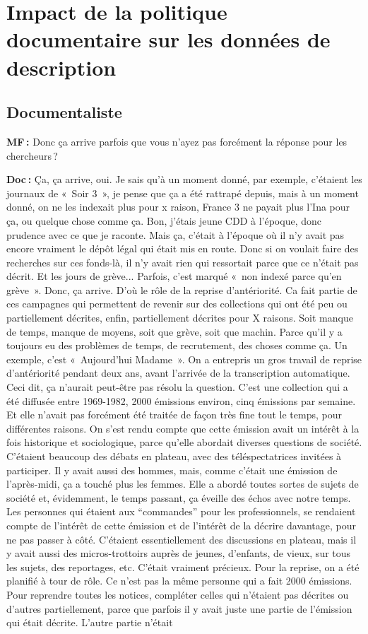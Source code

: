 \section*{Impact de la politique documentaire sur les données de description }

\subsection*{Documentaliste} 

\textbf{MF :} Donc ça arrive parfois que vous n’ayez pas forcément la réponse pour les chercheurs ? 

\textbf{Doc :} Ça, ça arrive, oui. Je sais qu'à un moment donné, par exemple, c'étaient les journaux de « Soir 3 », je pense que ça a été rattrapé depuis, mais à un moment donné, on ne les indexait plus pour x raison, France 3 ne payait plus l’Ina pour ça, ou quelque chose comme ça. Bon, j'étais jeune CDD à l'époque, donc prudence avec ce que je raconte. Mais ça, c'était à l'époque où il n'y avait pas encore vraiment le dépôt légal qui était mis en route. Donc si on voulait faire des recherches sur ces fonds-là, il n'y avait rien qui ressortait parce que ce n'était pas décrit. Et les jours de grève... Parfois, c'est marqué « non indexé parce qu'en grève ». Donc, ça arrive. D'où le rôle de la reprise d’antériorité. Ca fait partie de ces campagnes qui permettent de revenir sur des collections qui ont été peu ou partiellement décrites, enfin, partiellement décrites pour X raisons. Soit manque de temps, manque de moyens, soit que grève, soit que machin. Parce qu'il y a toujours eu des problèmes de temps, de recrutement, des choses comme ça.  Un exemple, c’est « Aujourd'hui Madame ». On a entrepris un gros travail de reprise d’antériorité pendant deux ans, avant l'arrivée de la transcription automatique. Ceci dit, ça n'aurait peut-être pas résolu la question. C'est une collection qui a été diffusée entre 1969-1982, 2000 émissions environ, cinq émissions par semaine. Et elle n'avait pas forcément été traitée de façon très fine tout le temps, pour différentes raisons. On s'est rendu compte que cette émission avait un intérêt à la fois historique et sociologique, parce qu’elle abordait diverses questions de société. C’étaient beaucoup des débats en plateau, avec des téléspectatrices invitées à participer. Il y avait aussi des hommes, mais, comme c'était une émission de l'après-midi, ça a touché plus les femmes. Elle a abordé toutes sortes de sujets de société et, évidemment, le temps passant, ça éveille des échos avec notre temps. Les personnes qui étaient aux “commandes” pour les professionnels, se rendaient compte de l'intérêt de cette émission et de l'intérêt de la décrire davantage, pour ne pas passer à côté. C’étaient essentiellement des discussions en plateau, mais il y avait aussi des micros-trottoirs auprès de jeunes, d'enfants, de vieux, sur tous les sujets, des reportages, etc. C'était vraiment précieux. Pour la reprise, on a été planifié à tour de rôle. Ce n'est pas la même personne qui a fait 2000 émissions. Pour reprendre toutes les notices, compléter celles qui n'étaient pas décrites ou d'autres partiellement, parce que parfois il y avait juste une partie de l'émission qui était décrite. L’autre partie n'était 